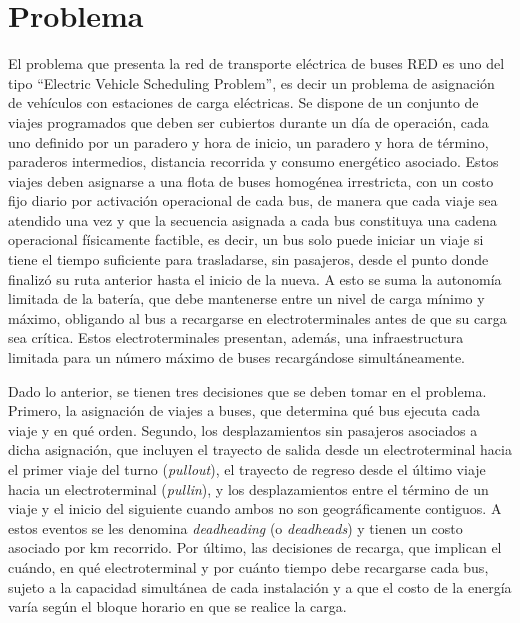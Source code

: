 \section{Problema \label{sec:problema}}

El problema que presenta la red de transporte el\'ectrica de buses RED es uno del tipo ``Electric Vehicle Scheduling Problem'', es decir un problema de asignaci\'on de veh\'iculos con estaciones de carga el\'ectricas. Se dispone de un conjunto de viajes programados que deben ser cubiertos durante un d\'ia de operaci\'on, cada uno definido por un paradero y hora de inicio, un paradero y hora de t\'ermino, paraderos intermedios, distancia recorrida y consumo energ\'etico asociado. Estos viajes deben asignarse a una flota de buses homog\'enea irrestricta, con un costo fijo diario por activaci\'on operacional de cada bus, de manera que cada viaje sea atendido una vez y que la secuencia asignada a cada bus constituya una cadena operacional f\'isicamente factible, es decir, un bus solo puede iniciar un viaje si tiene el tiempo suficiente para trasladarse, sin pasajeros, desde el punto donde finaliz\'o su ruta anterior hasta el inicio de la nueva. A esto se suma la autonom\'ia limitada de la bater\'ia, que debe mantenerse entre un nivel de carga m\'inimo y m\'aximo, obligando al bus a recargarse en electroterminales antes de que su carga sea cr\'itica. Estos electroterminales presentan, adem\'as, una infraestructura limitada para un n\'umero m\'aximo de buses recarg\'andose simult\'aneamente.

Dado lo anterior, se tienen tres decisiones que se deben tomar en el problema. Primero, la asignaci\'on de viajes a buses, que determina qu\'e bus ejecuta cada viaje y en qu\'e orden. Segundo, los desplazamientos sin pasajeros asociados a dicha asignaci\'on, que incluyen el trayecto de salida desde un electroterminal hacia el primer viaje del turno (\emph{pullout}), el trayecto de regreso desde el \'ultimo viaje hacia un electroterminal (\emph{pullin}), y los desplazamientos entre el t\'ermino de un viaje y el inicio del siguiente cuando ambos no son geogr\'aficamente contiguos. A estos eventos se les denomina \emph{deadheading} (o \emph{deadheads}) y tienen un costo asociado por km recorrido. Por \'ultimo, las decisiones de recarga, que implican el cu\'ando, en qu\'e electroterminal y por cu\'anto tiempo debe recargarse cada bus, sujeto a la capacidad simult\'anea de cada instalaci\'on y a que el costo de la energ\'ia var\'ia seg\'un el bloque horario en que se realice la carga.

